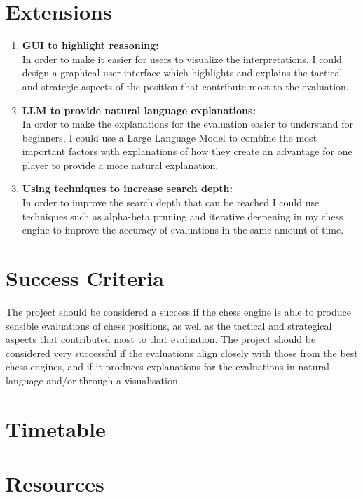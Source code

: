 \documentclass[12pt,a4paper]{article}
\begin{document}
\section*{Extensions}
\begin{enumerate}
    \item \textbf{GUI to highlight reasoning:}
    \\In order to make it easier for users to visualize the interpretations, I could design a graphical user interface which highlights and explains the tactical and strategic aspects of the position that contribute most to the evaluation.
    \item \textbf{LLM to provide natural language explanations:}
    \\In order to make the explanations for the evaluation easier to understand for beginners, I could use a Large Language Model to combine the most important factors with explanations of how they create an advantage for one player to provide a more natural explanation.
    \item \textbf{Using techniques to increase search depth:}
    \\In order to improve the search depth that can be reached I could use techniques such as alpha-beta pruning and iterative deepening in my chess engine to improve the accuracy of evaluations in the same amount of time.
\end{enumerate}



\section*{Success Criteria}
The project should be considered a success if the chess engine is able to produce sensible evaluations of chess positions, as well as the tactical and strategical aspects that contributed most to that evaluation. The project should be considered very successful if the evaluations align closely with those from the best chess engines, and if it produces explanations for the evaluations in natural language and/or through a visualisation.




\section*{Timetable}

\section*{Resources}
\end{document}
